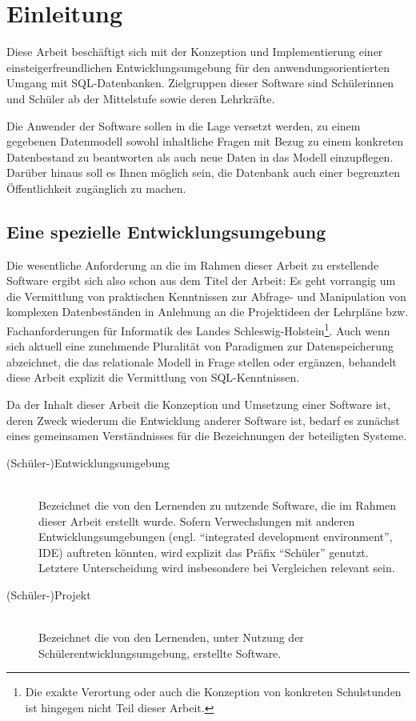 \documentclass[paper=a4,fontsize=11pt,parskip=half]{scrartcl}
\title{\doctitle}
\subtitle{\docsubtitle}
\author{\docauthors}
\date{\today{}}
\begin{document}

\newpage{}

\tableofcontents{}
\newpage{}


\section{Einleitung}

Diese Arbeit beschäftigt sich mit der Konzeption und Implementierung einer einsteigerfreundlichen Entwicklungsumgebung für den anwendungsorientierten Umgang mit SQL-Datenbanken. Zielgruppen dieser Software sind Schülerinnen und Schüler ab der Mittelstufe sowie deren Lehrkräfte.

Die Anwender der Software sollen in die Lage versetzt werden, zu einem gegebenen Datenmodell sowohl inhaltliche Fragen mit Bezug zu einem konkreten Datenbestand zu beantworten als auch neue Daten in das Modell einzupflegen. Darüber hinaus soll es Ihnen möglich sein, die Datenbank auch einer begrenzten Öffentlichkeit zugänglich zu machen.

\subsection{Eine spezielle Entwicklungsumgebung}

Die wesentliche Anforderung an die im Rahmen dieser Arbeit zu erstellende Software ergibt sich also schon aus dem Titel der Arbeit: Es geht vorrangig um die Vermittlung von praktischen Kenntnissen zur Abfrage- und Manipulation von komplexen Datenbeständen in Anlehnung an die Projektideen der Lehrpläne \cite{lehrplan-inf-sek-1} bzw. Fachanforderungen \cite{lehrplan-inf-sek-2} für Informatik des Landes Schleswig-Holstein\footnote{Die exakte Verortung oder auch die Konzeption von konkreten Schulstunden ist hingegen nicht Teil dieser Arbeit.}. Auch wenn sich aktuell eine zunehmende Pluralität von Paradigmen zur Datenspeicherung abzeichnet, die das relationale Modell in Frage stellen oder ergänzen, behandelt diese Arbeit explizit die Vermittlung von SQL-Kenntnissen. 

Da der Inhalt dieser Arbeit die Konzeption und Umsetzung einer Software ist, deren Zweck wiederum die Entwicklung anderer Software ist, bedarf es zunächst eines gemeinsamen Verständnisses für die Bezeichnungen der beteiligten Systeme.

\begin{description}
\item[(Schüler-)Entwicklungsumgebung] \hfill\\ 
  Bezeichnet die von den Lernenden zu nutzende Software, die im Rahmen dieser Arbeit erstellt wurde. Sofern Verwechslungen mit anderen Entwicklungsumgebungen (engl. ``integrated development environment'', IDE) auftreten könnten, wird explizit das Präfix ``Schüler'' genutzt. Letztere Unterscheidung wird insbesondere bei Vergleichen relevant sein.
\item[(Schüler-)Projekt] \hfill\\
  Bezeichnet die von den Lernenden, unter Nutzung der Schülerentwicklungsumgebung, erstellte Software.
\end{description}
\end{document}
